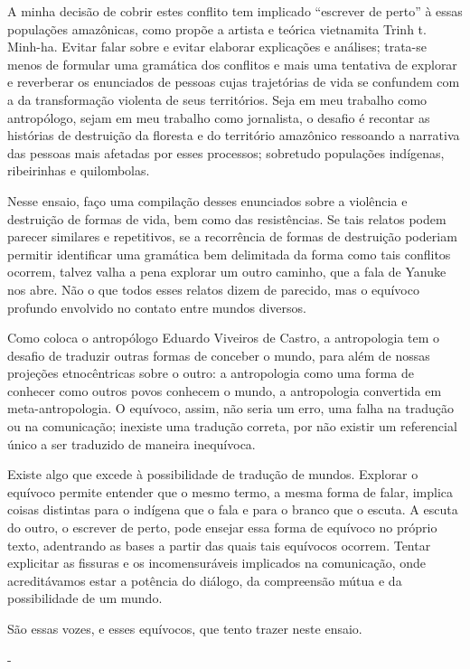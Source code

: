 A minha decisão de cobrir estes conflito tem implicado ``escrever de
perto'' à essas populações amazônicas, como propõe a artista e teórica
vietnamita Trinh t. Minh-ha. Evitar falar sobre e evitar elaborar
explicações e análises; trata-se menos de formular uma gramática dos
conflitos e mais uma tentativa de explorar e reverberar os enunciados de
pessoas cujas trajetórias de vida se confundem com a da transformação
violenta de seus territórios. Seja em meu trabalho como antropólogo,
sejam em meu trabalho como jornalista, o desafio é recontar as histórias
de destruição da floresta e do território amazônico ressoando a
narrativa das pessoas mais afetadas por esses processos; sobretudo
populações indígenas, ribeirinhas e quilombolas.

Nesse ensaio, faço uma compilação desses enunciados sobre a violência e
destruição de formas de vida, bem como das resistências. Se tais relatos
podem parecer similares e repetitivos, se a recorrência de formas de
destruição poderiam permitir identificar uma gramática bem delimitada da
forma como tais conflitos ocorrem, talvez valha a pena explorar um outro
caminho, que a fala de Yanuke nos abre. Não o que todos esses relatos
dizem de parecido, mas o equívoco profundo envolvido no contato entre
mundos diversos.

Como coloca o antropólogo Eduardo Viveiros de Castro, a antropologia tem
o desafio de traduzir outras formas de conceber o mundo, para além de
nossas projeções etnocêntricas sobre o outro: a antropologia como uma
forma de conhecer como outros povos conhecem o mundo, a antropologia
convertida em meta-antropologia. O equívoco, assim, não seria um erro,
uma falha na tradução ou na comunicação; inexiste uma tradução correta,
por não existir um referencial único a ser traduzido de maneira
inequívoca.

Existe algo que excede à possibilidade de tradução de mundos. Explorar o
equívoco permite entender que o mesmo termo, a mesma forma de falar,
implica coisas distintas para o indígena que o fala e para o branco que
o escuta. A escuta do outro, o escrever de perto, pode ensejar essa
forma de equívoco no próprio texto, adentrando as bases a partir das
quais tais equívocos ocorrem. Tentar explicitar as fissuras e os
incomensuráveis implicados na comunicação, onde acreditávamos estar a
potência do diálogo, da compreensão mútua e da possibilidade de um
mundo.

São essas vozes, e esses equívocos, que tento trazer neste ensaio.

-

